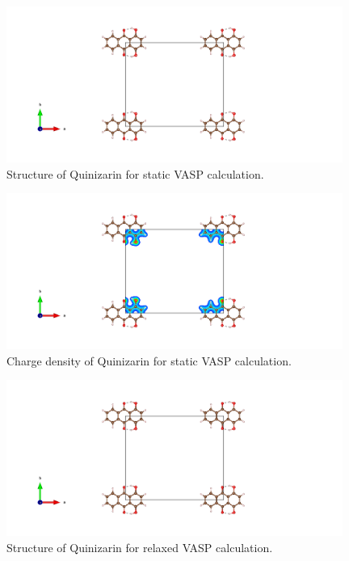\documentclass{article}
\begin{document}
  \begin{figure}[H]
      \centering
      \includegraphics[width = 11cm]{../fig/basic_staticbefore_CONTCAR.png}
      \caption{Structure of Quinizarin for static VASP calculation. }
      \label{fig:basic_staticbefore_CONTCAR}
  \end{figure}

  \begin{figure}[H]
      \centering
      \includegraphics[width = 11cm]{../fig/basic_staticbefore_CHGCAR.png}
      \caption{Charge density of Quinizarin for static VASP calculation. }
      \label{fig:basic_staticbefore_CHGCAR}
  \end{figure}

  \begin{figure}[H]
      \centering
      \includegraphics[width = 11cm]{../fig/basic_relax_CONTCAR.png}
      \caption{Structure of Quinizarin for relaxed VASP calculation. }
      \label{fig:basic_relax_CONTCAR}
  \end{figure}
\end{document}
